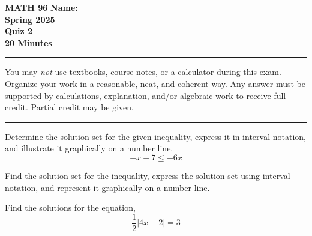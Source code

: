 \documentclass[11pt]{exam}
\begin{document}
\pagestyle{empty}
\textbf{MATH 96}  \textbf{Name:} \makebox[2.77in]{\hrulefill}\\
\textbf{Spring 2025} \\
\textbf{Quiz 2}\\
\textbf{20 Minutes}   

\rule[1ex]{\textwidth}{.1pt}
You may \emph{not} use textbooks, course notes, or a calculator during this exam. Organize your work in a reasonable, neat, and coherent way.  Any answer must be supported by calculations, explanation, and/or algebraic work to receive full credit. Partial credit may be given.
\vspace{5pt}\\
\rule[1ex]{\textwidth}{.1pt}
\noprintanswers
\begin{questions}
\vspace{-10pt}
\question[8] Determine the solution set for the given inequality, express it in interval notation, and illustrate it graphically on a number line. 
\[-x +7 \leq -6x\]

\vspace{2in}

\question[12] Find the solution set for the inequality, express the solution set using interval notation, and represent it graphically on a number line.


\question[10] Find the solutions for the equation,
\[\frac{1}{2}\vert 4x-2 \vert = 3\]


\addpoints
\end{questions}
\end{document}

